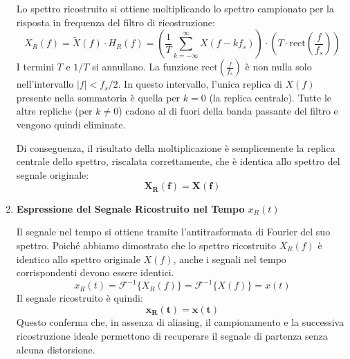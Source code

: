 \begin{soluzione}{5}
\begin{enumerate}
        Lo spettro ricostruito si ottiene moltiplicando lo spettro campionato per la risposta in frequenza del filtro di ricostruzione:
        \[
            X_R(f) = \tilde{X}(f) \cdot H_R(f) = \left( \frac{1}{T} \sum_{k=-\infty}^{\infty} X(f - k f_s) \right) \cdot \left( T \cdot \text{rect}\left(\frac{f}{f_s}\right) \right)
        \]
        I termini $T$ e $1/T$ si annullano. La funzione $\text{rect}\left(\frac{f}{f_s}\right)$ è non nulla solo nell'intervallo $|f| < f_s/2$. In questo intervallo, l'unica replica di $X(f)$ presente nella sommatoria è quella per $k=0$ (la replica centrale). Tutte le altre repliche (per $k \neq 0$) cadono al di fuori della banda passante del filtro e vengono quindi eliminate.
        
        Di conseguenza, il risultato della moltiplicazione è semplicemente la replica centrale dello spettro, riscalata correttamente, che è identica allo spettro del segnale originale:
        \[
            \mathbf{X_R(f) = X(f)}
        \]
        
        \item \textbf{Espressione del Segnale Ricostruito nel Tempo $x_R(t)$}
        
        Il segnale nel tempo si ottiene tramite l'antitrasformata di Fourier del suo spettro. Poiché abbiamo dimostrato che lo spettro ricostruito $X_R(f)$ è identico allo spettro originale $X(f)$, anche i segnali nel tempo corrispondenti devono essere identici.
        \[
            x_R(t) = \mathcal{F}^{-1}\{X_R(f)\} = \mathcal{F}^{-1}\{X(f)\} = x(t)
        \]
        Il segnale ricostruito è quindi:
        \[
            \mathbf{x_R(t) = x(t)}
        \]
        Questo conferma che, in assenza di aliasing, il campionamento e la successiva ricostruzione ideale permettono di recuperare il segnale di partenza senza alcuna distorsione.

    \end{enumerate}
\end{soluzione}